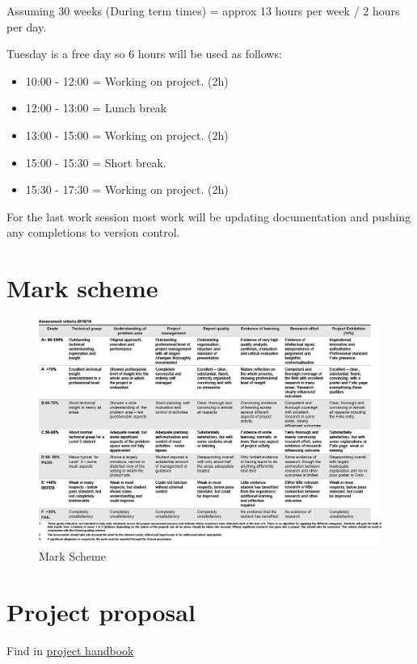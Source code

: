 Assuming 30 weeks (During term times) = approx 13 hours per week / 2
hours per day.

Tuesday is a free day so 6 hours will be used as follows:

\begin{itemize}
\tightlist
\item
  10:00 - 12:00 = Working on project. (2h)
\item
  12:00 - 13:00 = Lunch break
\item
  13:00 - 15:00 = Working on project. (2h)
\item
  15:00 - 15:30 = Short break.
\item
  15:30 - 17:30 = Working on project. (2h)
\end{itemize}

For the last work session most work will be updating documentation and
pushing any completions to version control.

\section{Mark scheme}\label{mark-scheme}

\begin{figure}[htbp]
\centering
\includegraphics{./Images/markscheme.png}
\caption{Mark Scheme}
\end{figure}

\section{Project proposal}\label{project-proposal}

Find in
\href{https://studentcentral.brighton.ac.uk/bbcswebdav/pid-2748868-dt-content-rid-5130686_1/xid-5130686_1}{project
handbook}
